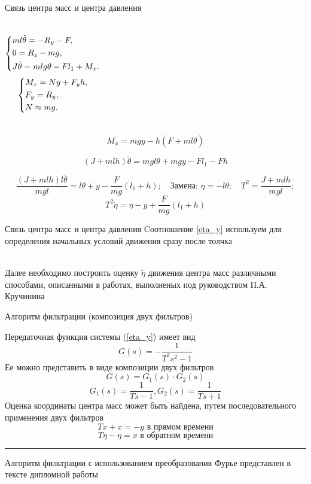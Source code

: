 \documentclass[10pt]{beamer}
\begin{document}
\begin{frame}{Связь центра масс и центра давления}
	\begin{columns}
		\begin{equation}\label{init_cond_1}
			\left\{ {\begin{aligned}
						 & ml\ddot{\theta} = -R_y-F , \hfill             \\
						 & 0=R_z-mg, \hfill                              \\
						 & J \ddot{\theta} = mlg\theta-Fl_1+M_x . \hfill \\
					\end{aligned}} \right.
		\end{equation}
		\begin{equation}\label{init_cond_2}
			\left\{ {\begin{aligned}
						 & M_x = Ny+F_yh , \hfill \\
						 & F_y = R_y , \hfill     \\
						 & N \approx mg . \hfill  \\
					\end{aligned}} \right.
		\end{equation}
	\end{columns}

	$$M_x=mgy-h\left(F+ml\ddot{\theta}\right)$$

	$$\left(J+mlh\right)\ddot{\theta}=mgl\theta+mgy-Fl_1-Fh$$


	$$\frac{(J+mlh)l\ddot{\theta}}{mgl}=l\theta+y-\frac{F}{mg}(l_1+h);\quad \text{Замена: }\eta=-l\theta; \quad T^2=\frac{J+mlh}{mgl};$$
	\begin{equation}\label{eta_y}
		T^2\ddot{\eta}=\eta-y+\frac{F}{mg}(l_1+h)
	\end{equation}

\end{frame}

\begin{frame}{Связь центра масс и центра давления}
	Cоотношение \eqref{eta_y} используем для определения начальных условий движения сразу после толчка

	\hfill \\
	Далее необходимо построить оценку $\tilde\eta$ движения центра масс различными способами, описанными в работах, выполненых под руководством П.А. Кручинина
\end{frame}


\begin{frame}{Алгоритм фильтрации (композиция двух фильтров)}

	Передаточная функция системы (\ref*{eta_y}) имеет вид
	\[
		G(s)=-\frac{1}{T^2s^2-1}
	\]
	Ее можно представить в виде композиции двух фильтров
	\[
		G(s)=G_1(s)\cdot G_2(s)
	\]
	\[
		G_1(s)=\frac{1}{Ts-1}, G_2(s)=\frac{1}{Ts+1}
	\]
	Оценка координаты центра масс может быть найдена, путем последовательного применения двух фильтров
	\[
		T \dot{x}+x=-y \text{ в прямом времени}
	\]
	\[
		T \dot{\eta}-\eta=x \text{ в обратном времени}
	\]
	\hrule
Алгоритм фильтрации с использованием преобразования Фурье представлен в тексте дипломной работы
\end{frame}
\end{document}
